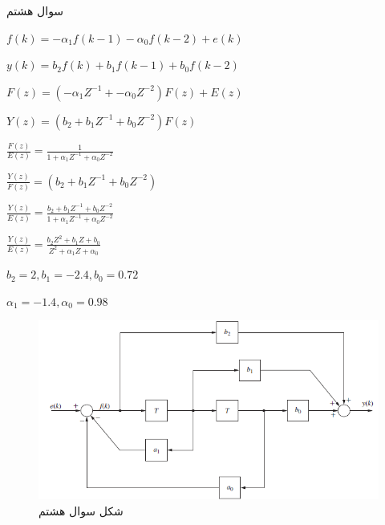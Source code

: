\documentclass{article}
\begin{document}
\begin{problem}{سوال هشتم}
	\raggedleft
	
	$f(k) = -\alpha_1f(k-1) -\alpha_0f(k-2) + e(k)$
	
	$y(k) = b_2f(k) + b_1f(k-1) + b_0f(k-2)$
	
	
	$F(z) = (-\alpha_1Z^{-1} + -\alpha_0Z^{-2})F(z) + E(z)$
	
	$Y(z) = (b_2 + b_1Z^{-1} + b_0Z^{-2})F(z)$
	
	
	$\frac{F(z)}{E(z)} = \frac{1}{1 + \alpha_1Z^{-1} + \alpha_0Z^{-2}}$
	
	$\frac{Y(z)}{F(z)} = (b_2 + b_1Z^{-1} + b_0Z^{-2})$
	
	$\frac{Y(z)}{E(z)} = \frac{b_2 + b_1Z^{-1} + b_0Z^{-2}}{1 + \alpha_1Z^{-1} + \alpha_0Z^{-2}}$
	
	
	$\frac{Y(z)}{E(z)} = \frac{b_2Z^2 + b_1Z + b_0}{Z^2 + \alpha_1Z + \alpha_0}$
	
	$b_2 = 2, b_1 = -2.4, b_0 = 0.72 $
	
	$\alpha_1 = -1.4, \alpha_0 = 0.98 $
	




\end{problem}
\begin{figure}
	\includegraphics[width=\linewidth]{Second Series/3.png}
	\caption{شکل سوال هشتم}
\end{figure}
\end{document}
